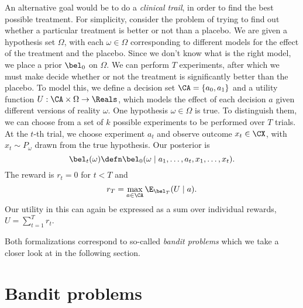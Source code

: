 \begin{example}
  An alternative goal would be to do a \emph{clinical trail}, in order to find the best possible treatment. For simplicity, consider the problem of trying to find out whether a particular treatment is better or not than a placebo.  We are given a hypothesis set $\Omega$, with each $\omega \in \Omega$ corresponding to different models for the effect of the treatment and the placebo. Since we don't know what is the right model, we place a prior $\bel_0$ on $\Omega$. We can perform $T$ experiments, after which we must make decide whether or not the treatment is significantly better than the placebo. To model this, we define a decision set $\CA = \{a_0, a_1\}$ and a utility function $U : \CA \times \Omega \to \Reals$, which models the effect of each decision $a$ given different versions of reality $\omega$. One hypothesis $\omega \in \Omega$ is true. To distinguish them, we can choose
  from a set of $k$ possible experiments to be performed over $T$
  trials.  At the $t$-th trial, we choose experiment $a_t$ and observe outcome $x_t \in \CX$, with $x_t \sim
  P_\omega$ drawn from the true hypothesis. Our posterior is
  \[
  \bel_t(\omega) \defn
  \bel_0(\omega \mid a_1, \ldots, a_t, x_1, \ldots, x_t).
  \]
  The reward is $r_t = 0$ for $t < T$ and
  \[
  r_T = \max_{a \in \CA}\E_{\bel_T}(U \mid a).
  \]
  Our utility in this can again be expressed as a sum over individual rewards,  $U = \sum_{t=1}^T r_t$.
\end{example}
Both formalizations correspond to so-called {\em bandit problems} which we take a closer look at in the following section.

\section{Bandit problems}
\label{sec:exp-design-bandit}

